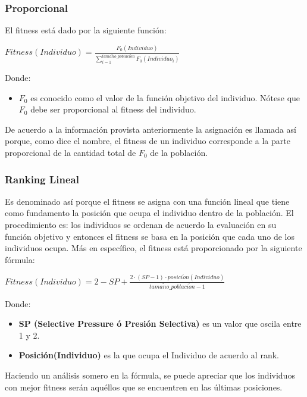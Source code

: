 \documentclass[class=report, crop=false]{standalone}
\begin{document}
\subsubsection{Proporcional}
El fitness está dado por la siguiente función:\medskip\break
\centerline{$Fitness(Individuo) = \frac{F_0(Individuo)}{\sum_{i=1}^{tama\tilde{n}o\_poblaci\acute{o}n}F_0(Individuo_i)}$}\medskip\break
Donde:

\begin{itemize}
\item $F_0$ es conocido como el valor de la función objetivo del 
individuo. Nótese que $F_0$ debe ser proporcional al fitness del 
individuo.
\end{itemize}

De acuerdo a la información provista anteriormente la asignación 
es llamada así porque, como dice el nombre, el fitness de un 
individuo corresponde a la parte proporcional de la cantidad 
total de $F_0$ de la población.

\subsubsection{Ranking Lineal}
Es denominado así porque el fitness se asigna con una función 
lineal que tiene como fundamento la posición que ocupa el 
individuo dentro de la población.\break
El procedimiento es: los individuos se ordenan de acuerdo 
la evaluación en su función objetivo y entonces el fitness 
se basa en la posición que cada uno de los individuos ocupa. 
Más en específico, el fitness está proporcionado por la 
siguiente fórmula:\medskip\break
\centerline{$Fitness(Individuo) = 2 - SP + \frac{2 \cdot (SP - 1) \cdot posici\acute{o}n(Individuo)}{tama\tilde{n}o\_poblaci\acute{o}n - 1}$}\medskip\break
Donde:

\begin{itemize}
\item \textbf{SP (Selective Pressure ó Presión Selectiva)} es un valor que oscila entre 1 y 2.
\item \textbf{Posición(Individuo)} es la que ocupa el Individuo de acuerdo al rank.
\end{itemize}

Haciendo un análisis somero en la fórmula, se puede apreciar 
que los individuos con mejor fitness serán aquéllos que se 
encuentren en las últimas posiciones.

\end{document}

